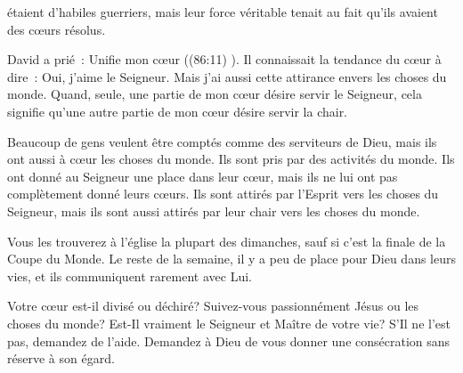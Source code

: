 


 étaient d'habiles guerriers, mais leur force véritable
 tenait au fait qu'ils avaient des c\oe{}urs résolus. 

David a prié~:
 \og Unifie mon c\oe{}ur \fg{} ((86:11) \NBS).
 Il connaissait la tendance du c\oe{}ur à dire~:
 \og Oui, j'aime le Seigneur. Mais j'ai aussi cette attirance
 envers les choses du monde. \fg{}
 Quand, seule, une partie de mon c\oe{}ur désire servir le Seigneur,
 cela signifie qu'une autre partie de mon c\oe{}ur désire servir la chair. 


Beaucoup de gens veulent être comptés comme des serviteurs de Dieu,
 mais ils ont aussi à c\oe{}ur les choses du monde.
 Ils sont pris par des activités du monde.
 Ils ont donné au Seigneur une place dans leur c\oe{}ur,
 mais ils ne lui ont pas complètement donné leurs c\oe{}urs.
 Ils sont attirés par l'Esprit vers les choses du Seigneur,
 mais ils sont aussi attirés par leur chair vers les choses du monde. 

Vous les trouverez à l'église la plupart des dimanches,
 sauf si c'est la finale de la Coupe du Monde. Le reste de la semaine,
 il y a peu de place pour Dieu dans leurs vies,
 et ils communiquent rarement avec Lui. 

Votre c\oe{}ur est-il divisé ou déchiré?
 Suivez-vous passionnément Jésus ou les choses du monde?
 Est-Il vraiment le Seigneur et Maître de votre vie?
 S'Il ne l'est pas, demandez de l'aide. Demandez à Dieu de vous donner
 une consécration sans réserve à son égard. 

\dvrule






